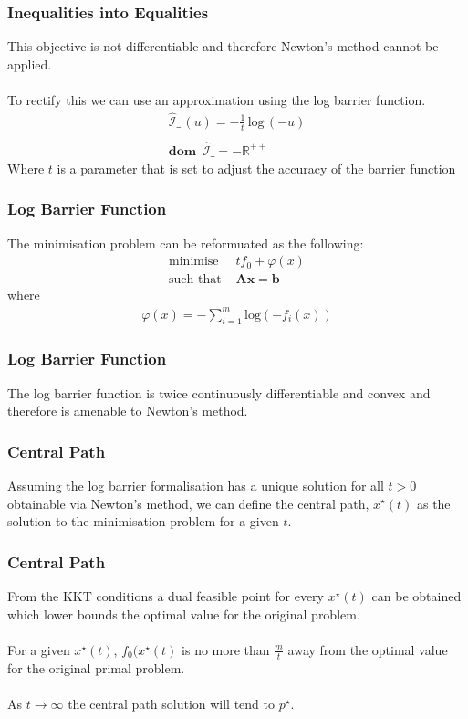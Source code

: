 \documentclass{beamer}
\def\rnum{\mathbb{R}}
\begin{document}
\begin{frame}
    \frametitle{Inequalities into Equalities}
    This objective is not differentiable and therefore Newton's method cannot be
    applied.
    \\~\\
    To rectify this we can use an approximation using the log barrier function.
    \begin{align*}
        \hat{\mathcal{I}}\_\, (u) = -\frac{1}{t}\, \text{log}\,(-u) \\\\
        \mathbf{dom} \,\,\,\hat{\mathcal{I}}\_ = -\rnum^{++}
    \end{align*}
    Where $t$ is a parameter that is set to adjust the accuracy of the barrier
    function
\end{frame}

\begin{frame}
    \frametitle{Log Barrier Function}
    The minimisation problem can be reformuated as the following:
    \begin{align*}
        \text{minimise } \, &t f_{0} +
        \varphi(x)\\
        \text{such that } & \mathbf{A}\mathbf{x} =\mathbf{b}
    \end{align*}
    where
    \begin{align*}
        \varphi(x) = - \sum\limits_{i=1}^{m}\text{log}(-f_{i}(x))
    \end{align*}
\end{frame}

\begin{frame}
    \frametitle{Log Barrier Function}
    The log barrier function is twice continuously differentiable and convex
    and therefore is amenable to Newton's method.
\end{frame}


\begin{frame}
    \frametitle{Central Path}
    Assuming the log barrier formalisation has a unique solution for all
    $t > 0$ obtainable via Newton's method, we can define the central path,
    $x^{\star}(t)$ as the solution to the minimisation problem for a given
    $t$.
\end{frame}

\begin{frame}
    \frametitle{Central Path}
    From the KKT conditions a dual feasible point for every
    $x^{\star}(t)$ can be obtained which lower bounds the optimal value for
    the original problem.
    \\~\\
    For a given $x^{\star}(t)$, $f_{0}(x^{\star}(t)$ is no more than
    $\frac{m}{t}$ away from the optimal value for the original primal problem.
    \\~\\
    As $t \rightarrow \infty$ the central path solution will tend to
    $p^{\star}$.
\end{frame}
\end{document}
